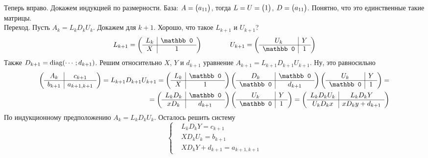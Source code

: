 \documentclass{article}
\begin{document}
\begin{itemize}
\begin{Proof}
\begin{Comment}
            \end{Comment}
            Теперь вправо. Докажем индукцией по размерности. База:
            $A=\left(\begin{matrix}a_{11}\end{matrix}\right)$, тогда $L=U=\left(\begin{matrix}1\end{matrix}\right)$, $D=\left(\begin{matrix}a_{11}\end{matrix}\right)$. Понятно, что это единственные такие матрицы.\\
            Переход. Пусть $A_k=L_kD_kU_k$. Докажем для $k+1$. Хорошо, что такое $L_{k+1}$ и $U_{k+1}$?
            $$
            L_{k+1}=\arr{c|c}{
                L_k & \mathbb0\\\hline
                X & 1
            }\qquad\qquad
            U_{k+1}=\arr{c|c}{
                U_k & Y\\\hline
                \mathbb0 & 1
            }
            $$
            Также $D_{k+1}=\operatorname{diag}(\cdots;d_{k+1})$. Решим относительно $X$, $Y$ и $d_{k+1}$ уравнение $A_{k+1}=L_{k+1}D_{k+1}U_{k+1}$. Ну, это равносильно
            \[\begin{split}
                \arr{c|c}{
                    A_k & c_{k+1}\\\hline
                    b_{k+1} & a_{k+1,k+1}
                }=
                L_{k+1}D_{k+1}U_{k+1}=\arr{c|c}{
                    L_k & \mathbb0\\\hline
                    X & 1
                }\arr{c|c}{
                    D_k & \mathbb0\\\hline
                    \mathbb0 & d_{k+1}
                }\arr{c|c}{
                    U_k & Y\\\hline
                    \mathbb0 & 1
                }=\\
                =\arr{c|c}{
                    L_kD_k & \mathbb0\\\hline
                    xD_k & d_{k+1}
                }\arr{c|c}{
                    U_k & Y\\\hline
                    \mathbb0 & 1
                }=\arr{c|c}{
                    L_kD_kU_k & L_kD_kY\\\hline
                    U_kD_kx & xD_ky+d_{k+1}
                }
            \end{split}\]
            По индукционному предположению $A_k=L_kD_kU_k$. Осталось решить систему
            $$
            \left\{\begin{aligned}
                &L_kD_kY=c_{k+1}\\
                &XD_kU_k=b_{k+1}\\
                &XD_kY+d_{k+1}=a_{k+1,k+1}
            \end{aligned}\right.
            $$

\end{Proof}
\end{itemize}
\end{document}
